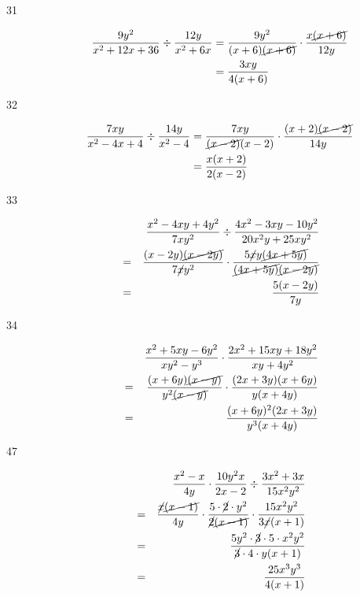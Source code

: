 \documentclass[fleqn,addpoints]{exam}
\begin{document}
\begin{description}
\item[31]
\begin{align*}
  \frac{9y^2}{x^2 + 12x + 36} \div \frac{12y}{x^2 + 6x} &= \frac{9y^2}{(x + 6)\cancel{(x + 6)}} \cdot \frac{x \cancel{(x + 6)}}{12y} \\
  &= \frac{3xy}{4(x + 6)}
\end{align*}

\item[32]
\begin{align*}
  \frac{7xy}{x^2 - 4x + 4} \div \frac{14y}{x^2 - 4} &= 
            \frac{7xy}{\cancel{(x - 2)}(x - 2)} \cdot \frac{(x + 2)\cancel{(x - 2)}}{14y} \\
  &= \frac{x(x + 2)}{2(x - 2)} \\
\end{align*}

\item[33]
\begin{eqnarray*}
  &   & \frac{x^2 - 4xy + 4y^2}{7xy^2} \div \frac{4x^2 - 3xy - 10y^2}{20x^2y + 25xy^2} \\
  & = & \frac{(x - 2y)\cancel{(x-2y)}}{7 \cancel{x} y^2} \cdot \frac{5 \cancel{x} y \cancel{(4x + 5y)} }{ \cancel{(4x + 5y)} \cancel{(x - 2y)}} \\
  & = & \frac{5(x - 2y)}{7y}
\end{eqnarray*}

\item[34]
\begin{eqnarray*}
  &   & \frac{x^2 + 5xy - 6y^2}{xy^2 - y^3} \cdot \frac{2x^2 + 15xy + 18y^2}{xy + 4y^2} \\
  & = & \frac{(x + 6y) \cancel{(x - y)} }{ y^2 \cancel{(x - y)}} \cdot \frac{(2x + 3y)(x + 6y)}{y(x + 4y)} \\
  & = & \frac{(x + 6y)^2(2x + 3y)}{y^3(x + 4y)} \\
\end{eqnarray*}

\item[47]
\begin{eqnarray*}
  &   & \frac{x^2 - x}{4y} \cdot \frac{10y^2x}{2x - 2} \div \frac{3x^2 + 3x}{15x^2y^2} \\
  & = & \frac{\cancel{x} \cancel{(x - 1)} }{4y} \cdot 
  \frac{5 \cdot \cancel{2} \cdot y^2}{ \cancel{2} \cancel{(x - 1)}} \cdot 
  \frac{15x^2y^2} {3 \cancel{x}(x + 1)} \\
  & = &\frac{5y^2 \cdot \cancel{3} \cdot 5 \cdot x^2y^2}{\cancel{3} \cdot 4 \cdot y(x + 1)} \\
  & = & \frac{25x^3y^3}{4(x + 1)} \\
\end{eqnarray*}

\end{description}
\end{document}
